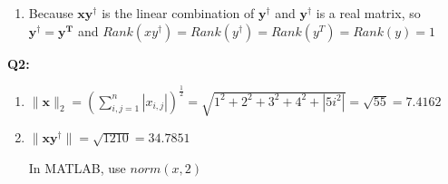 \documentclass[a4paper,fleqn]{article}
\begin{document}
\begin{enumerate}
    \item Because $\mathbf{xy^\dagger}$ is the linear combination of $\mathbf{y^\dagger}$ and $\mathbf{y^\dagger}$ is a real matrix, so $\mathbf{y^\dagger=y^T}$ and $Rank(xy^\dagger)=Rank(y^\dagger)=Rank(y^T)=Rank(y)=1$
    
    \end{enumerate}

    \newpage
    \Large{\textbf{Q2:}}
    \begin{enumerate}
        \item 
        $\|\mathbf{x}\|_2 = (\sum\limits_{i,j=1}^n |x_{i,j}|)^\frac{1}{2} = \sqrt{1^2+2^2+3^2+4^2+|5i^2|} = \sqrt{55}=7.4162$

        \item 
        $\|\mathbf{xy^\dagger}\|=\sqrt{1210}=34.7851$

        In MATLAB, use $norm(x, 2)$
    \end{enumerate}
\end{document}
